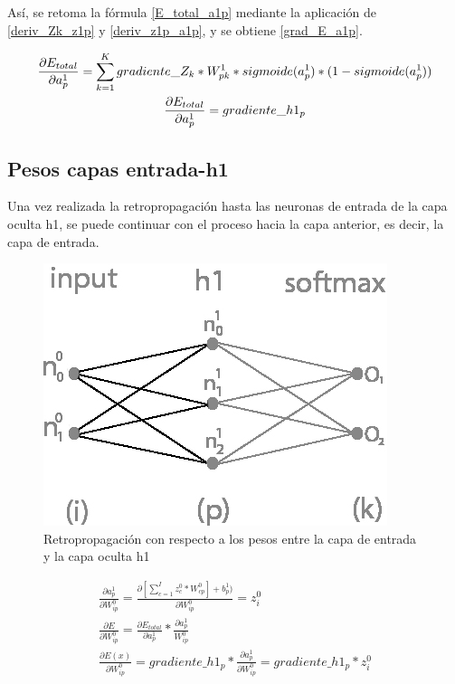 Así, se retoma la fórmula \ref{E_total_a1p} mediante la aplicación de \ref{deriv_Zk_z1p} y \ref{deriv_z1p_a1p}, y se obtiene \ref{grad_E_a1p}.

\begin{gather}
	\frac{\partial E_{total}}{\partial a^1_p} = \sum_{k=1}^K  gradiente\_Z_k * W^1_{pk} * sigmoide(a^1_p)*(1-sigmoide(a^1_p)) \label{grad_E_a1p} \\
	\frac{\partial E_{total}}{\partial a^1_p} = gradiente\_h1_p \notag
\end{gather}

\subsection{Pesos capas entrada-h1}

Una vez realizada la retropropagación hasta las neuronas de entrada de la capa oculta h1, se puede continuar con el proceso hacia la capa anterior, es decir, la capa de entrada.

\begin{figure}[H]
	\centering
	\includegraphics[scale=0.35]{imagenes/nn_1_capa_pesos_input_h1.jpg}  
	\caption{Retropropagación con respecto a los pesos entre la capa de entrada y la capa oculta h1}
	\label{fig:nn_1_pesos_input_h1}
\end{figure}


\begin{gather}
	\frac{\partial a^1_p }{\partial W^0_{ip} } = \frac{\partial [\sum_{c=1}^{I} z^0_c * W^0_{cp}] + b^1_p)}{\partial W^0_{ip} } = z^0_i \label{grad_w0ip_1} \\
	\frac{\partial E}{\partial W^0_{ip}} = \frac{\partial E_{total} }{\partial a^1_p } * \frac{\partial a^1_p}{W^0_{ip}} \label{grad_w0ip_2} \\
	\frac{\partial E(x) }{\partial W^0_{ip} } = gradiente\_h1_p * \frac{\partial a^1_p }{\partial W^0_{ip} } = gradiente\_h1_p * z^0_i 
	\label{grad_w0ip_3}
\end{gather}

